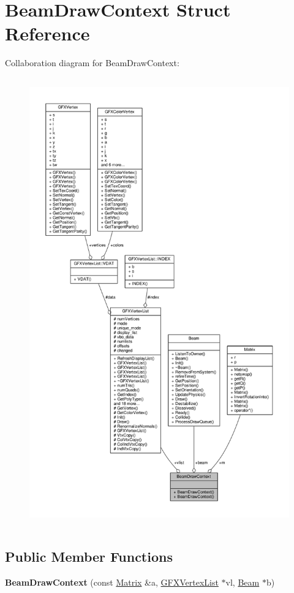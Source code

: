 \hypertarget{structBeamDrawContext}{}\section{Beam\+Draw\+Context Struct Reference}
\label{structBeamDrawContext}


Collaboration diagram for Beam\+Draw\+Context\+:
\nopagebreak
\begin{figure}[H]
\begin{center}
\leavevmode
\includegraphics[height=550pt]{da/d5f/structBeamDrawContext__coll__graph}
\end{center}
\end{figure}
\subsection*{Public Member Functions}
\begin{DoxyCompactItemize}
\item 
{\bfseries Beam\+Draw\+Context} (const \hyperlink{classMatrix}{Matrix} \&a, \hyperlink{classGFXVertexList}{G\+F\+X\+Vertex\+List} $\ast$vl, \hyperlink{classBeam}{Beam} $\ast$b)\hypertarget{structBeamDrawContext_abb0b66975d3a8691207c392011dde568}{}\label{structBeamDrawContext_abb0b66975d3a8691207c392011dde568}

\end{DoxyCompactItemize}

